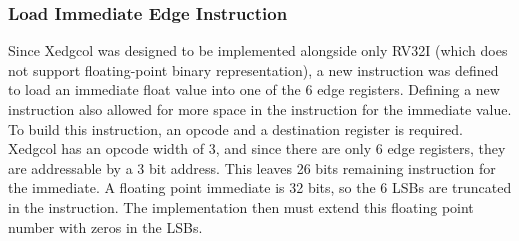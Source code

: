     \subsubsection{Load Immediate Edge Instruction}
    Since Xedgcol was designed to be implemented alongside only RV32I (which does not support floating-point binary representation), a new instruction was defined to load an immediate float value into one of the 6 edge registers. Defining a new instruction also allowed for more space in the instruction for the immediate value. To build this instruction, an opcode and a destination register is required. Xedgcol has an opcode width of 3, and since there are only 6 edge registers, they are addressable by a 3 bit address. This leaves 26 bits remaining instruction for the immediate. A floating point immediate is 32 bits, so the 6 \glspl{LSB} are truncated in the instruction. The implementation then must extend this floating point number with zeros in the \glspl{LSB}.
